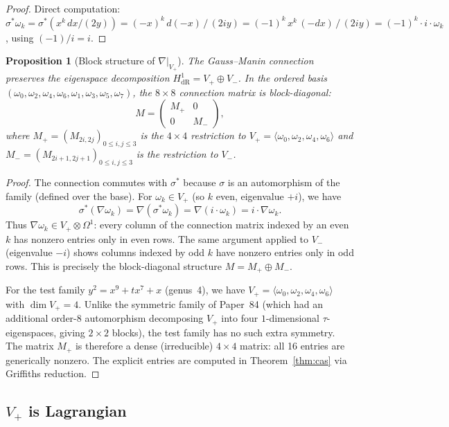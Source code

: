 \documentclass[11pt]{article}
\theoremstyle{plain}
\newtheorem{proposition}[theorem]{Proposition}
\theoremstyle{definition}
\theoremstyle{remark}
\newcommand{\HdR}{H^1_{\mathrm{dR}}}
\begin{document}
\begin{proof}
Direct computation:
$\sigma^*\omega_k = \sigma^*(x^k\, dx/(2y))
= (-x)^k\, d(-x)\,/\,(2iy)
= (-1)^k\, x^k\, (-dx)\,/\,(2iy)
= (-1)^k \cdot i \cdot \omega_k$,
using $(-1)/i = i$.
\end{proof}

\begin{proposition}[Block structure of $\nabla|_{V_+}$]\label{prop:block}
The Gauss--Manin connection preserves the eigenspace decomposition
$\HdR = V_+ \oplus V_-$.  In the ordered basis
$(\omega_0, \omega_2, \omega_4, \omega_6, \omega_1, \omega_3, \omega_5, \omega_7)$,
the $8 \times 8$ connection matrix is block-diagonal:
\[
  M = \begin{pmatrix} M_+ & 0 \\ 0 & M_- \end{pmatrix},
\]
where $M_+ = (M_{2i,2j})_{0 \le i,j \le 3}$ is the $4 \times 4$
restriction to $V_+ = \langle\omega_0, \omega_2, \omega_4, \omega_6\rangle$
and $M_- = (M_{2i+1,2j+1})_{0 \le i,j \le 3}$ is the restriction
to $V_-$.
\end{proposition}

\begin{proof}
The connection commutes with $\sigma^*$ because $\sigma$ is an
automorphism of the family (defined over the base).  For
$\omega_k \in V_+$ (so $k$ even, eigenvalue $+i$), we have
\[
  \sigma^*(\nabla \omega_k)
  = \nabla(\sigma^* \omega_k)
  = \nabla(i \cdot \omega_k)
  = i \cdot \nabla \omega_k.
\]
Thus $\nabla \omega_k \in V_+ \otimes \Omega^1$: every column of the
connection matrix indexed by an even $k$ has nonzero entries only in
even rows.  The same argument applied to $V_-$ (eigenvalue $-i$) shows
columns indexed by odd $k$ have nonzero entries only in odd rows.
This is precisely the block-diagonal structure $M = M_+ \oplus M_-$.

For the test family $y^2 = x^9 + tx^7 + x$ (genus~4), we have
$V_+ = \langle\omega_0, \omega_2, \omega_4, \omega_6\rangle$ with
$\dim V_+ = 4$.  Unlike the symmetric family of Paper~84 (which had
an additional order-8 automorphism decomposing $V_+$ into four
$1$-dimensional $\tau$-eigenspaces, giving $2 \times 2$ blocks), the
test family has no such extra symmetry.  The matrix $M_+$ is therefore
a dense (irreducible) $4 \times 4$ matrix: all 16 entries are generically
nonzero.  The explicit entries are computed in
Theorem~\ref{thm:cas} via Griffiths reduction.
\end{proof}

\subsection{$V_+$ is Lagrangian}
\end{document}
